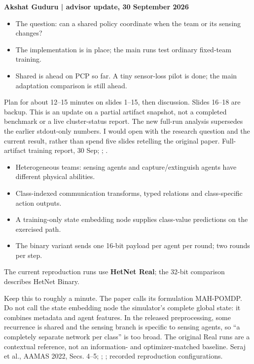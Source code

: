 {\textbf{Akshat Guduru \quad | \quad advisor update, 30 September 2026}
\bigskip
\begin{itemize}
\item The question: can a shared policy coordinate when the team or its sensing changes?
\item The implementation is in place; the main runs test ordinary fixed-team training.
\item Shared is ahead on PCP so far. A tiny sensor-loss pilot is done; the main adaptation comparison is still ahead.
\end{itemize}
}
{Plan for about 12--15 minutes on slides 1--15, then discussion. Slides 16--18 are backup. This is an update on a partial artifact snapshot, not a completed benchmark or a live cluster-status report. The new full-run analysis supersedes the earlier stdout-only numbers. I would open with the research question and the current result, rather than spend five slides retelling the original paper.}
{Full-artifact training report, 30 Sep; ; .}

{\begin{itemize}
\item Heterogeneous teams: sensing agents and capture/extinguish agents have different physical abilities.
\item Class-indexed communication transforms, typed relations and class-specific action outputs.
\item A training-only state embedding node supplies class-value predictions on the exercised path.
\item The binary variant sends one 16-bit payload per agent per round; two rounds per step.
\end{itemize}
\small The current reproduction runs use \textbf{HetNet Real}; the 32-bit comparison describes HetNet Binary.}
{Keep this to roughly a minute. The paper calls its formulation MAH-POMDP. Do not call the state embedding node the simulator's complete global state: it combines metadata and agent features. In the released preprocessing, some recurrence is shared and the sensing branch is specific to sensing agents, so ``a completely separate network per class'' is too broad. The original Real runs are a contextual reference, not an information- and optimizer-matched baseline.}
{Seraj et al., AAMAS 2022, Secs. 4--5; ; ; recorded reproduction configurations.}

